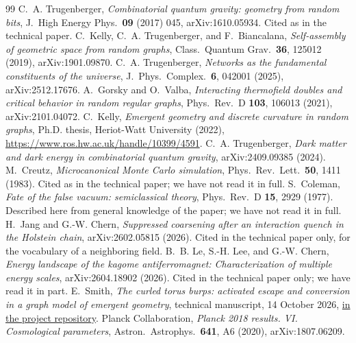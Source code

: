 \documentclass[11pt,letterpaper]{article}
\begin{document}
\renewcommand{\refname}{Sources}
\begin{thebibliography}{99}\small
 C.~A. Trugenberger, \emph{Combinatorial quantum gravity: geometry from random bits}, 
J.\ High Energy Phys.\ \textbf{09} (2017) 045, arXiv:1610.05934. Cited as in the technical paper.
 C.~Kelly, C.~A. Trugenberger, and F.~Biancalana, \emph{Self-assembly of geometric space
from random graphs}, Class.\ Quantum Grav.\ \textbf{36}, 125012 (2019), arXiv:1901.09870.
 C.~A. Trugenberger, \emph{Networks as the fundamental constituents of the universe},
J.\ Phys.\ Complex.\ \textbf{6}, 042001 (2025), arXiv:2512.17676.
 A.~Gorsky and O.~Valba, \emph{Interacting thermofield doubles and critical behavior in
random regular graphs}, Phys.\ Rev.\ D \textbf{103}, 106013 (2021), arXiv:2101.04072.
 C.~Kelly, \emph{Emergent geometry and discrete curvature in random graphs}, Ph.D.
thesis, Heriot-Watt University (2022), \url{https://www.ros.hw.ac.uk/handle/10399/4591}.
 C.~A. Trugenberger, \emph{Dark matter and dark energy in combinatorial quantum gravity},
arXiv:2409.09385 (2024).
 M.~Creutz, \emph{Microcanonical Monte Carlo simulation}, Phys.\ Rev.\ Lett.\ \textbf{50},
1411 (1983). Cited as in the technical paper; we have not read it in full.
 S.~Coleman, \emph{Fate of the false vacuum: semiclassical theory}, Phys.\ Rev.\ D
\textbf{15}, 2929 (1977). Described here from general knowledge of the paper; we have not read it in
full.
 H.~Jang and G.-W. Chern, \emph{Suppressed coarsening after an interaction quench in the
Holstein chain}, arXiv:2602.05815 (2026). Cited in the technical paper only, for the vocabulary of a
neighboring field.
 B.~B. Le, S.-H. Lee, and G.-W. Chern, \emph{Energy landscape of the kagome antiferromagnet:
Characterization of multiple energy scales}, arXiv:2604.18902 (2026). Cited in the technical paper only; we
have read it in part.
 E.~Smith, \emph{The curled torus burps: activated escape and conversion in a graph model
of emergent geometry}, technical manuscript, 14 October 2026,
\href{https://github.com/EmilySmithCreate/RecreationalPhysics/tree/main/docs/papers/01_curled_torus}{in the project repository}.
 Planck Collaboration, \emph{Planck 2018 results. VI. Cosmological parameters},
Astron.\ Astrophys.\ \textbf{641}, A6 (2020), arXiv:1807.06209.

\end{thebibliography}
\end{document}
